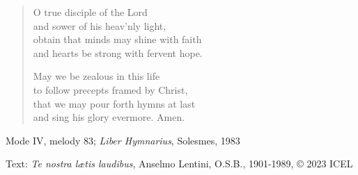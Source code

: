 \hymn



\setlength{\vleftmargin}{2em}
\begin{verse}
O true disciple of the Lord\\
and sower of his heav’nly light,\\
obtain that minds may shine with faith\\
and hearts be strong with fervent hope.

May we be zealous in this life\\
to follow precepts framed by Christ,\\
that we may pour forth hymns at last\\
and sing his glory evermore. Amen.
\end{verse}
\setlength{\vleftmargin}{\defleftmargini}

\begin{hymnsource}
Mode IV, melody 83; \emph{Liber Hymnarius}, Solesmes, 1983

Text: \emph{Te nostra lætis laudibus}, Anselmo Lentini, O.S.B., 1901-1989, © 2023 ICEL
\end{hymnsource}
